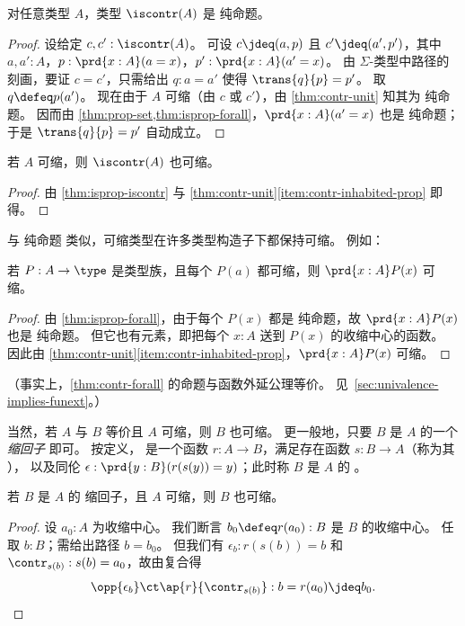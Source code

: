 \begin{lem}\label{thm:isprop-iscontr}
  对任意类型 $A$，类型 $\iscontr(A)$ 是 纯命题。
\end{lem}
\begin{proof}
  设给定 $c,c':\iscontr(A)$。
  可设 $c\jdeq(a,p)$ 且 $c'\jdeq(a',p')$，其中 $a,a':A$，$p:\prd{x:A} (a=x)$，$p':\prd{x:A} (a'=x)$。
  由 $\Sigma$-类型中路径的刻画，要证 $c=c'$，只需给出 $q:a=a'$ 使得 $\trans{q}{p}=p'$。
  取 $q\defeq p(a')$。
  现在由于 $A$ 可缩（由 $c$ 或 $c'$），由 \cref{thm:contr-unit} 知其为 纯命题。
  因而由 \cref{thm:prop-set,thm:isprop-forall}，$\prd{x:A}(a'=x)$ 也是 纯命题；于是 $\trans{q}{p}=p'$ 自动成立。
\end{proof}

\begin{cor}\label{thm:contr-contr}
  若 $A$ 可缩，则 $\iscontr(A)$ 也可缩。
\end{cor}
\begin{proof}
  由 \cref{thm:isprop-iscontr} 与 \cref{thm:contr-unit}\ref{item:contr-inhabited-prop} 即得。
\end{proof}

与 纯命题 类似，可缩类型在许多类型构造子下都保持可缩。
例如：

\begin{lem}\label{thm:contr-forall}
  若 $P:A\to\type$ 是类型族，且每个 $P(a)$ 都可缩，则 $\prd{x:A} P(x)$ 可缩。
\end{lem}
\begin{proof}
  由 \cref{thm:isprop-forall}，由于每个 $P(x)$ 都是 纯命题，故 $\prd{x:A} P(x)$ 也是 纯命题。
  但它也有元素，即把每个 $x:A$ 送到 $P(x)$ 的收缩中心的函数。
  因此由 \cref{thm:contr-unit}\ref{item:contr-inhabited-prop}，$\prd{x:A} P(x)$ 可缩。
\end{proof}

%
（事实上，\cref{thm:contr-forall} 的命题与函数外延公理等价。
见~\cref{sec:univalence-implies-funext}。）

当然，若 $A$ 与 $B$ 等价且 $A$ 可缩，则 $B$ 也可缩。
更一般地，只要 $B$ 是 $A$ 的一个 \emph{缩回子} 即可。
按定义，
%
%
是一个函数 $r : A \to B$，满足存在函数 $s : B \to A$（称为其 ），
%
%
以及同伦 $\epsilon:\prd{y:B} (r(s(y))=y)$；此时称 $B$ 是 $A$ 的 %
。

\begin{lem}\label{thm:retract-contr}
  若 $B$ 是 $A$ 的 缩回子，且 $A$ 可缩，则 $B$ 也可缩。
\end{lem}
\begin{proof}
  设 $a_0 : A$ 为收缩中心。
  我们断言 $b_0 \defeq r(a_0) : B$ 是 $B$ 的收缩中心。
  任取 $b : B$；需给出路径 $b = b_0$。
  但我们有 $\epsilon_b : r(s(b)) = b$ 和 $\contr_{s(b)} : s(b) = a_0$，故由复合得
  \[ \opp{\epsilon_b} \ct \ap{r}{\contr_{s(b)}} : b = r(a_0) \jdeq b_0. \qedhere\]
\end{proof}

